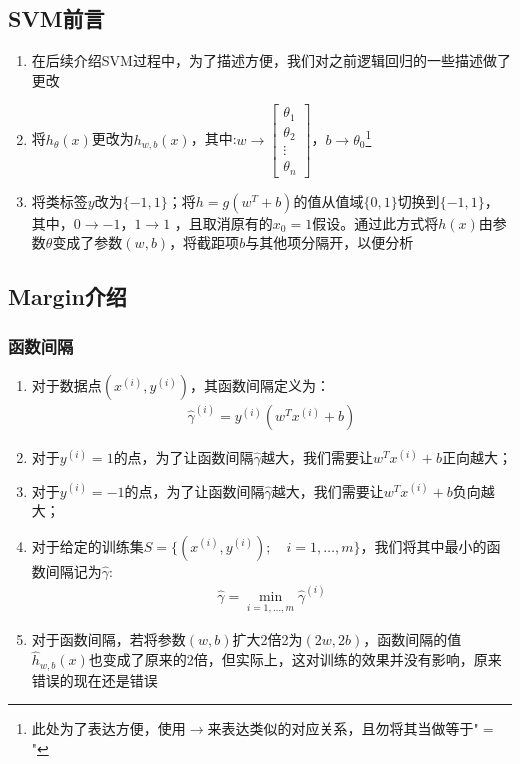 \subsection{SVM前言}
\begin{enumerate}
	\item 在后续介绍SVM过程中，为了描述方便，我们对之前逻辑回归的一些描述做了更改
	\item 将$h_\theta(x)$更改为$h_{w,b}(x)$，其中:$w \to \left[\begin{matrix}\theta_1 \\ \theta_2 \\ \vdots \\ \theta_n  \end{matrix}\right]$，$b \to \theta_0$\footnote{此处为了表达方便，使用$\to$来表达类似的对应关系，且勿将其当做等于"$=$"}
	\item 将类标签$y$改为$\{-1, 1\}$；将$h=g(w^T+b)$的值从值域$\{0,1\}$切换到$\{-1, 1\}$，其中，$0\to -1$，$1\to 1$
	，且取消原有的$x_0=1$假设。通过此方式将$h(x)$由参数$\theta$变成了参数$(w, b)$，将截距项$b$与其他项分隔开，以便分析
\end{enumerate}

\subsection{Margin介绍}
\subsubsection{函数间隔}
\begin{enumerate}
	\item 对于数据点$(x^{(i)}, y^{(i)})$，其函数间隔定义为：
	\begin{align}
		\hat{\gamma}^{(i)} = y^{(i)}(w^Tx^{(i)} + b)
	\end{align}
	\item 对于$y^{(i)}=1$的点，为了让函数间隔$\hat{\gamma}$越大，我们需要让$w^Tx^{(i)} + b$正向越大；
	\item 对于$y^{(i)}=-1$的点，为了让函数间隔$\hat{\gamma}$越大，我们需要让$w^Tx^{(i)} + b$负向越大；
	\item 对于给定的训练集$S=\{(x^{(i)}, y^{(i)}); \quad i = 1, \dots, m\}$，我们将其中最小的函数间隔记为$\hat{\gamma}$:
	\begin{align}
		\hat{\gamma} = \min_{i=1,\dots,m}\hat{\gamma}^{(i)}
	\end{align}
	\item 对于函数间隔，若将参数$(w,b)$扩大2倍2为$(2w,2b)$，函数间隔的值$\hat{h}_{w,b}(x)$也变成了原来的2倍，但实际上，这对训练的效果并没有影响，原来错误的现在还是错误
\end{enumerate}

